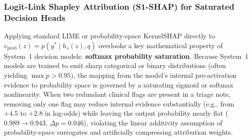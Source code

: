 \documentclass[10pt]{article}
\begin{document}
\subsubsection{Logit-Link Shapley Attribution (S1-SHAP) for Saturated Decision Heads}
\label{sec:s1shap}
Applying standard LIME or probability-space KernelSHAP directly to $v_{\text{prob}}(z) = p(y^* \mid h_s(z), q)$ overlooks a key mathematical property of System~1 decision models: \textbf{softmax probability saturation}.
Because System~1 models are trained to emit sharp categorical or binary distributions (often yielding $\max p > 0.95$), the mapping from the model's internal pre-activation evidence to probability space is governed by a saturating sigmoid or softmax nonlinearity.
When two redundant clinical flags are present in a triage note, removing only one flag may reduce internal evidence substantially (e.g., from $+4.5$ to $+2.8$ in log-odds) while leaving the output probability nearly flat ($0.989 \to 0.943$, $\Delta p = 0.046$), violating the linear additivity assumption of probability-space surrogates and artificially compressing attribution weights.
\end{document}
